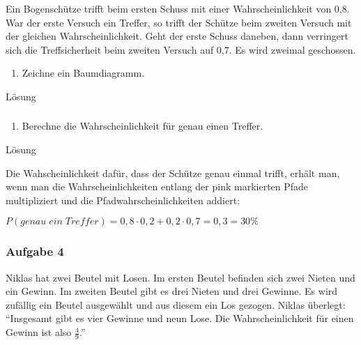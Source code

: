 \documentclass[
  ngerman,
]{book}
\providecommand{\tightlist}{%
  \setlength{\itemsep}{0pt}\setlength{\parskip}{0pt}}
\begin{document}
Ein Bogenschütze trifft beim ersten Schuss mit einer Wahrscheinlichkeit von 0,8. War der erste Versuch ein Treffer, so trifft der Schütze beim zweiten Versuch mit der gleichen Wahrscheinlichkeit. Geht der erste Schuss daneben, dann verringert sich die Treffsicherheit beim zweiten Versuch auf 0,7. Es wird zweimal geschossen.

\begin{enumerate}
\def\labelenumi{\alph{enumi})}
\tightlist
\item
  Zeichne ein Baumdiagramm.
\end{enumerate}

Lösung

\hypertarget{section-149}{%
\subsubsection*{}\label{section-149}}

\begin{enumerate}
\def\labelenumi{\alph{enumi})}
\setcounter{enumi}{1}
\tightlist
\item
  Berechne die Wahrscheinlichkeit für genau einen Treffer.
\end{enumerate}

Lösung

Die Wahscheinlichkeit dafür, dass der Schütze genau einmal trifft, erhält man, wenn man die Wahrscheinlichkeiten entlang der pink markierten Pfade multipliziert und die Pfadwahrscheinlichkeiten addiert:

\(P(genau\;ein\;Treffer)= 0,8 \cdot 0,2 + 0,2 \cdot 0,7 = 0,3 = 30\%\)

\hypertarget{section-150}{%
\subsubsection*{}\label{section-150}}

\hypertarget{aufgabe-4-4}{%
\subsubsection*{Aufgabe 4}\label{aufgabe-4-4}}

Niklas hat zwei Beutel mit Losen. Im ersten Beutel befinden sich zwei Nieten und ein Gewinn. Im zweiten Beutel gibt es drei Nieten und drei Gewinne. Es wird zufällig ein Beutel ausgewählt und aus diesem ein Los gezogen. Niklas überlegt: ``Insgesamt gibt es vier Gewinne und neun Lose. Die Wahrscheinlichkeit für einen Gewinn ist also \(\frac{4}{9}\).''
\end{document}

